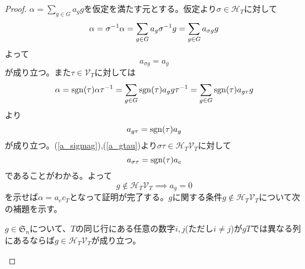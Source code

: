 \documentclass{ltjsreport}
\begin{document}
\begin{proof}
  $\alpha=\sum_{g\in G}a_gg$を仮定を満たす元とする。仮定より$\sigma\in \mathcal{H}_T$に対して
  \[
  \alpha=\sigma^{-1}\alpha=\sum_{g\in G}a_g\sigma^{-1} g=\sum_{g\in G}a_{\sigma g}g
  \]
  よって
  \begin{equation}
    a_{\sigma g}=a_g  \label{a_sigmag}
  \end{equation}
  が成り立つ。また$\tau\in\mathcal{V}_T$に対しては
  \[
  \alpha=\mathrm{sgn}(\tau)\alpha\tau^{-1}=\sum_{g\in G}\mathrm{sgn}(\tau)a_gg\tau^{-1}=\sum_{g\in G}\mathrm{sgn}(\tau)a_{g\tau}{g}
  \]
  より
  \begin{equation}
    a_{g\tau}=\mathrm{sgn}(\tau)a_g  \label{a_gtau}
  \end{equation}
  が成り立つ。(\ref{a_sigmag}),(\ref{a_gtau})より$\sigma\tau\in\mathcal{H}_T\mathcal{V}_T$に対して
  \[
  a_{\sigma\tau}=\mathrm{sgn}(\tau)a_{e}  
  \]
  であることがわかる。よって
  \begin{equation}
  g\notin\mathcal{H}_T\mathcal{V}_T\implies a_g=0 \label{lemm:coefficient_zero} 
  \end{equation}
  を示せば$\alpha=a_ec_T$となって証明が完了する。$g$に関する条件$g\notin\mathcal{H}_T\mathcal{V}_T$について次の補題を示す。
  \begin{lemm}\label{lamm:117}
    $g\in\mathfrak{S}_n$について、$T$の同じ行にある任意の数字$i,j$(ただし$i\neq j$)が$gT$では異なる列にあるならば$g\in\mathcal{H}_T\mathcal{V}_T$が成り立つ。
  \end{lemm}


\end{proof}
\end{document}
